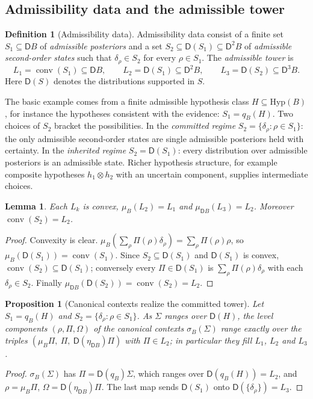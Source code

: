 \documentclass[11pt]{article}
\newtheorem{proposition}[theorem]{Proposition}
\newtheorem{lemma}[theorem]{Lemma}
\theoremstyle{definition}
\newtheorem{definition}[theorem]{Definition}
\theoremstyle{remark}
\newcommand{\D}{\mathsf{D}}
\newcommand{\Hyp}{\mathrm{Hyp}}
\begin{document}
\subsection{Admissibility data and the admissible tower}

\begin{definition}[Admissibility data]\label{def:admdata}
Admissibility data consist of a finite set $S_1\subseteq\D B$ of \emph{admissible posteriors} and a
set $S_2\subseteq\D(S_1)\subseteq\D^2B$ of \emph{admissible second-order states} such that
$\delta_\rho\in S_2$ for every $\rho\in S_1$. The \emph{admissible tower} is
\[
L_1=\operatorname{conv}(S_1)\subseteq\D B,\qquad L_2=\D(S_1)\subseteq\D^2B,\qquad
L_3=\D(S_2)\subseteq\D^3B .
\]
Here $\D(S)$ denotes the distributions supported in $S$.
\end{definition}

The basic example comes from a finite admissible hypothesis class $H\subseteq\Hyp(B)$, for instance
the hypotheses consistent with the evidence: $S_1=q_B(H)$. Two choices of $S_2$ bracket the
possibilities. In the \emph{committed regime} $S_2=\{\delta_\rho:\rho\in S_1\}$: the only admissible
second-order states are single admissible posteriors held with certainty. In the \emph{inherited
regime} $S_2=\D(S_1)$: every distribution over admissible posteriors is an admissible state. Richer
hypothesis structure, for example composite hypotheses $h_1\otimes h_2$ with an uncertain component,
supplies intermediate choices.

\begin{lemma}\label{lem:adm-tower}
Each $L_k$ is convex, $\mu_B(L_2)=L_1$ and $\mu_{\D B}(L_3)=L_2$. Moreover $\operatorname{conv}(S_2)=L_2$.
\end{lemma}
\begin{proof}
Convexity is clear. $\mu_B(\sum_\rho\Pi(\rho)\delta_\rho)=\sum_\rho\Pi(\rho)\rho$, so
$\mu_B(\D(S_1))=\operatorname{conv}(S_1)$. Since $S_2\subseteq\D(S_1)$ and $\D(S_1)$ is convex,
$\operatorname{conv}(S_2)\subseteq\D(S_1)$; conversely every $\Pi\in\D(S_1)$ is
$\sum_\rho\Pi(\rho)\delta_\rho$ with each $\delta_\rho\in S_2$. Finally
$\mu_{\D B}(\D(S_2))=\operatorname{conv}(S_2)=L_2$.
\end{proof}

\begin{proposition}[Canonical contexts realize the committed tower]\label{prop:committed}
Let $S_1=q_B(H)$ and $S_2=\{\delta_\rho:\rho\in S_1\}$. As $\Sigma$ ranges over $\D(H)$, the level
components $(\rho,\Pi,\Omega)$ of the canonical contexts $\sigma_B(\Sigma)$ range exactly over the
triples $(\mu_B\Pi,\ \Pi,\ \D(\eta_{\D B})\Pi)$ with $\Pi\in L_2$; in particular they fill $L_1$, $L_2$
and $L_3$.
\end{proposition}
\begin{proof}
$\sigma_B(\Sigma)$ has $\Pi=\D(q_B)\Sigma$, which ranges over $\D(q_B(H))=L_2$, and $\rho=\mu_B\Pi$,
$\Omega=\D(\eta_{\D B})\Pi$. The last map sends $\D(S_1)$ onto $\D(\{\delta_\rho\})=L_3$.
\end{proof}
\end{document}
